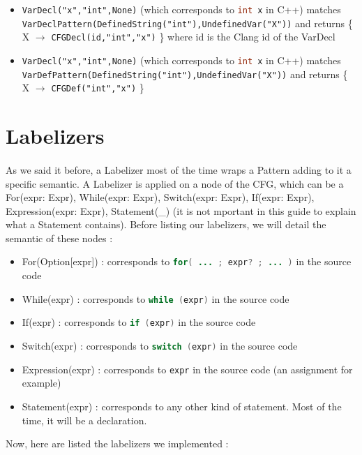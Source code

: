 \documentclass{report}
\begin{document}
\vspace{1.5mm}
\begin{itemize}
\item \lstinline|VarDecl("x","int",None)| (which corresponds to \lstinline[language=java]|int x| in C++) matches \lstinline|VarDeclPattern(DefinedString("int"),UndefinedVar("X"))| and returns \{ X $\rightarrow$ \lstinline|CFGDecl(id,"int","x")| \} where id is the Clang id of the VarDecl\vspace{1mm}
\item \lstinline|VarDecl("x","int",None)| (which corresponds to \lstinline[language=java]|int x| in C++) matches \lstinline|VarDefPattern(DefinedString("int"),UndefinedVar("X"))| and returns \{ X $\rightarrow$ \lstinline|CFGDef("int","x")| \}\vspace{1mm}
\end{itemize}

\section{Labelizers}

\paragraph{}
\hspace{4mm}As we said it before, a Labelizer most of the time wraps a Pattern adding to it a specific semantic. 
A Labelizer is applied on a node of the CFG, which can be a For(expr: Expr), While(expr: Expr), Switch(expr: Expr), If(expr: Expr), Expression(expr: Expr), Statement(\_) (it is not mportant in this guide to explain what a Statement contains).
Before listing our labelizers, we will detail the semantic of these nodes :

\begin{itemize}
	\item{For(Option[expr]) :} corresponds to \lstinline[language=java]|for( ... ; expr? ; ... )| in the source code
	\item{While(expr) :} corresponds to \lstinline[language=java]|while (expr)| in the source code
	\item{If(expr) :} corresponds to \lstinline[language=java]|if (expr)| in the source code
	\item{Switch(expr) :} corresponds to \lstinline[language=java]|switch (expr)| in the source code
	\item{Expression(expr) :} corresponds to \lstinline[language=java]|expr| in the source code (an assignment for example)
	\item{Statement(expr) :} corresponds to any other kind of statement. Most of the time, it will be a declaration.
\end{itemize}
Now, here are listed the labelizers we implemented :
\end{document}
